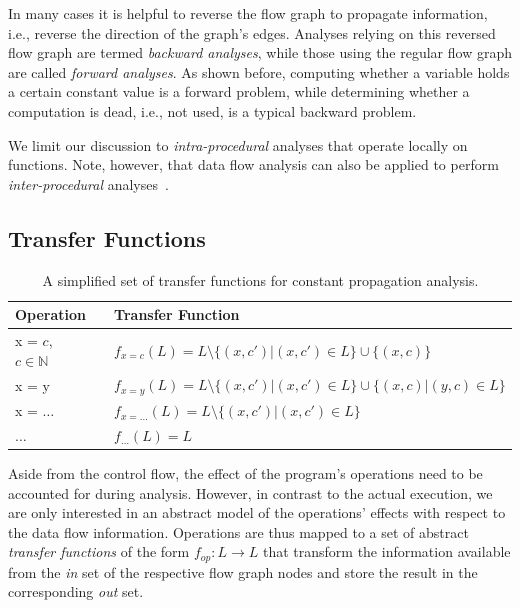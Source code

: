 In many cases it is helpful to reverse the flow graph to propagate information,
i.e., reverse the direction of the graph's edges. Analyses relying on this
reversed flow graph are termed \emph{backward analyses}, while those using the
regular flow graph are called \emph{forward analyses}. As shown before,
computing whether a variable holds a certain constant value is a forward
problem, while determining whether a computation is dead, i.e., not used, is a
typical backward problem.

We limit our discussion to \emph{intra-procedural} analyses that operate locally
on functions. Note, however, that data flow analysis can also be applied to
perform \emph{inter-procedural} analyses~\cite{novillo:bib:NNH99}.

\subsection{Transfer Functions}

\begin{table}[b]
  \begin{center}
    \begin{tabular}{lp{8mm}l}
      Operation                   & & Transfer Function                      \\ \hline
      x = $c$, $c \in \mathbb{N}$ & & $f_{x=c}(L) = L \setminus \{ (x, c') | (x, c') \in L \} \cup \{ (x, c) \}$ \\
      x = y                       & & $f_{x=y}(L) = L \setminus \{ (x, c') | (x, c') \in L \} \cup \{ (x, c) | (y,c) \in L\}$ \\
      x = $\ldots$                & & $f_{x=\ldots}(L) = L \setminus \{ (x, c') | (x, c') \in L \}$ \\
      $\ldots$                    & & $f_{\ldots}(L) = L$ \\ \hline
    \end{tabular}
  \end{center}
  \caption{A simplified set of transfer functions for constant propagation
           analysis.}
  \label{novillo:fig:transfer_functions}
\end{table}

Aside from the control flow, the effect of the program's operations
need to be accounted for during analysis. However, in contrast to the actual
execution, we are only interested in an abstract model of the operations'
effects with respect to the data flow information. Operations are thus mapped to
a set of abstract \emph{transfer functions} of the form $f_{op}: L \rightarrow
L$ that transform the information available from the \emph{in} set of the
respective flow graph nodes and store the result in the corresponding \emph{out}
set.

